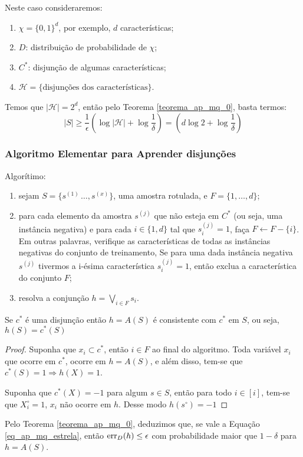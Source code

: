 Neste caso consideraremos:

\begin{enumerate}
    \item $\chi = \{0,1\}^d$, por exemplo, $d$ características;
    \item $D$: distribuição de probabilidade de $\chi$;
    \item $C^*$: disjunção de algumas características;
    \item $\mathcal{H} = \{\text{disjunções dos características}\}$.
\end{enumerate}{}

Temos que $|\mathcal{H}| = 2^d$, então pelo Teorema \ref{teorema_ap_mq_0}, basta termos:
\begin{equation}
\label{eq_ap_mq_estrela}
    |S| \geq \frac{1}{\epsilon}\left(\log{|\mathcal{H}|} + \log{\frac{1}{\delta}}\right) = \left(d\log{2} + \log{\frac{1}{\delta}}\right)
\end{equation}

\subsubsection*{Algoritmo Elementar para Aprender disjunções}

Algorítimo:
\begin{enumerate}
    \item sejam $S = \{s^{(1)}\, \dots, s^{(x)}\}$, uma amostra rotulada,  e $F = \{1, \dots, d\}$;
    \item para cada elemento da amostra $s^{(j)}$ que não esteja em $C^*$ (ou seja, uma instância negativa) e para cada $i \in \{1,d\}$ tal que $s^{(j)}_i = 1$, faça $F \leftarrow F - \{i\}$. Em outras palavras, verifique as  características de todas as instâncias negativas do conjunto de treinamento, Se para uma dada instância negativa $s^{(j)}$ tivermos a i-ésima característica $s^{(j)}_i = 1$, então exclua a característica do conjunto $F$;
    \item resolva a conjunção $h = \bigvee_{i \in F}s_i$.
\end{enumerate}

\begin{lema}
Se $c^*$ é uma disjunção então $h = A(S)$ é consistente com $c^*$ em $S$, ou seja, $h(S) = c^*(S)$
\end{lema}

\begin{proof}
Suponha que $x_i \subset c^*$, então $i \in F$ ao final do algoritmo.
Toda variável $x_i$ que ocorre em $c^*$, ocorre em $h = A(S)$, e além disso, tem-se que $c^*(S) = 1 \Rightarrow h(X) = 1$.

Suponha que $c^*(X) = -1$ para algum $s \in S$, então para todo $i \in [i]$, tem-se que $X_{i}^{\circ} = 1$, $x_i$ não ocorre em $h$. Desse modo $h(s^\circ) = -1$
\end{proof}

Pelo Teorema \ref{teorema_ap_mq_0}, deduzimos que, se vale a Equação \ref{eq_ap_mq_estrela}, então $\operatorname{err}_D(h) \leq \epsilon$ com probabilidade maior que $1-\delta$ para $h=A(S)$.